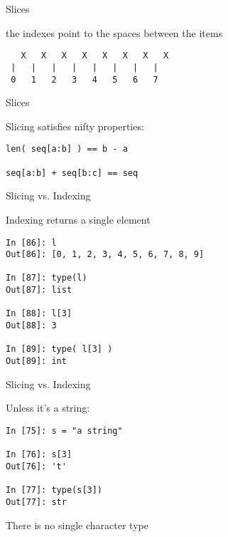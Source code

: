 \documentclass{beamer}
\begin{document}
\begin{frame}[fragile]{Slices}

{\Large the indexes point to the spaces between the items}

\vfill
\begin{verbatim}
   X   X   X   X   X   X   X   X
 |   |   |   |   |   |   |   | 
 0   1   2   3   4   5   6   7
\end{verbatim}

\end{frame}

\begin{frame}[fragile]{Slices}

{\Large Slicing satisfies nifty properties:

\vfill
\begin{verbatim}
len( seq[a:b] ) == b - a

seq[a:b] + seq[b:c] == seq

\end{verbatim}

}

\end{frame}

\begin{frame}[fragile]{Slicing vs. Indexing}

{\Large Indexing returns a single element}

\begin{verbatim}
In [86]: l
Out[86]: [0, 1, 2, 3, 4, 5, 6, 7, 8, 9]

In [87]: type(l)
Out[87]: list

In [88]: l[3]
Out[88]: 3

In [89]: type( l[3] )
Out[89]: int
\end{verbatim}
\end{frame}

\begin{frame}[fragile]{Slicing vs. Indexing}

{\Large Unless it's a string:}

\begin{verbatim}
In [75]: s = "a string"

In [76]: s[3]
Out[76]: 't'

In [77]: type(s[3])
Out[77]: str
\end{verbatim}

\vfill
There is no single character type

\end{frame}
\end{document}
